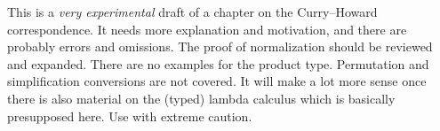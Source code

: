 \documentclass[../../../include/open-logic-chapter]{subfiles}
\begin{document}

\begin{editorial}
  This is a \emph{very experimental} draft of a chapter on the
  Curry--Howard correspondence.  It needs more explanation and
  motivation, and there are probably errors and omissions. The proof
  of normalization should be reviewed and expanded. There are no
  examples for the product type. Permutation and simplification
  conversions are not covered. It will make a lot more sense once
  there is also material on the (typed) lambda calculus which is
  basically presupposed here. Use with extreme caution.
\end{editorial}


\OLEndChapterHook
\end{document}
